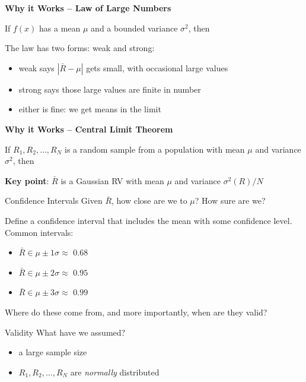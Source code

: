 \noindent\textbf{Why it Works -- Law of Large Numbers}

If $f(x)$ has a mean $\mu$ and a bounded variance $\sigma^2$, then

\begin{center}
\end{center}
 
 
The law has two forms:
\textcolor{mitred}{weak} and \textcolor{mitred}{strong}: 
\begin{itemize}
 \item weak says $|\bar{R} - \mu|$ gets small, with occasional large values
 \item strong says those large values are  finite in number
 \item either is fine: we get \textcolor{mitred}{means} in the limit
\end{itemize}


\noindent\textbf{Why it Works -- Central Limit Theorem}

If $R_{1}, R_{2}, \dots, R_{N}$ is a random sample from a 
population with mean $\mu$ and variance $\sigma^{2}$, then \\

\begin{center}
\end{center}
\textbf{Key point}: $\bar{R}$ is a Gaussian RV with mean $\mu$ and 
variance $\sigma^2(R)/N$


{Confidence Intervals}
  Given $\bar{R}$, how close are we to $\mu$?  How sure are we?
 
  Define a \textcolor{mitred}{confidence interval} that includes
  the mean with some confidence level.  Common intervals:
  \begin{itemize}
       \item $\bar{R} \in \mu \pm 1 \sigma \approx$   $0.68$
       \item $\bar{R} \in \mu \pm 2 \sigma \approx$   $0.95$
       \item $\bar{R} \in \mu \pm 3 \sigma \approx$   $0.99$
  \end{itemize}
 
  Where do these come from, and more importantly, 
  \textcolor{mitred}{when are they valid}?
  
{Validity}
  What have we assumed?
  \begin{itemize}
     \item a large sample size
     \item $R_{1}, R_{2}, \dots, R_{N}$ are \emph{normally} distributed
  \end{itemize}
 

